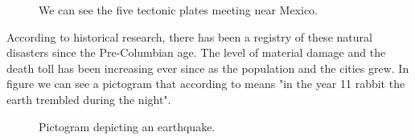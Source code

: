 \begin{figure}[h]
  \begin{center}
  \end{center}
  \label{fig:plates}
  \caption{We can see the five tectonic plates meeting near Mexico.}
\end{figure}

According to historical research, there has been a registry of these natural disasters since the Pre-Columbian age. The level of material damage and the death toll has been increasing ever since as the population and the cities grew. In figure \cite{fig:codice} we can see a pictogram that according to \cite{sismosmexico} means "in the year 11 rabbit the earth trembled during the night".\\


\begin{figure}[h]
  \begin{center}
  \end{center}
  \caption{Pictogram depicting an earthquake.}
\end{figure}

